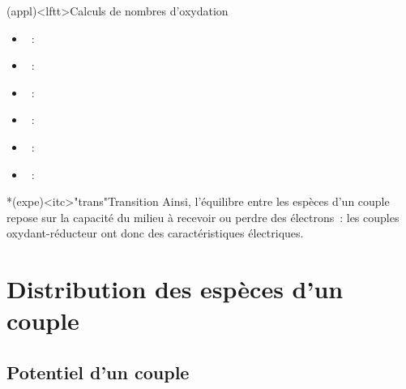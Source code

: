 \documentclass[../../main/main.tex]{subfiles}
\begin{document}
\begin{tcb*}[sidebyside, lefthand ratio=.26](appl)<lftt>{Calculs de nombres d'oxydation}
	\small
	\begin{itemize}
		\item {}~: 
		\item {}~: 
		\item {}~: 
	\end{itemize}
	\tcblower
	\small
	\begin{itemize}
		\item {}~: 
		\item {}~: 
		\item {}~: 
	\end{itemize}
\end{tcb*}

\begin{tcb}*(expe)<itc>"trans"{Transition}
	Ainsi, l'équilibre entre les espèces d'un couple repose sur la capacité du
	milieu à recevoir ou perdre des électrons~: les couples oxydant-réducteur ont
	donc des caractéristiques électriques.
\end{tcb}

\section{Distribution des espèces d'un couple}
\subsection{Potentiel d'un couple}
\end{document}
